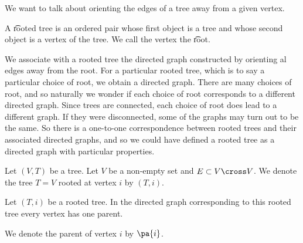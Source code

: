
\sbasic














\sstart
{}


We want to talk about orienting the edges of a tree away from a given vertex.


A \t{rooted tree} is an ordered pair whose first object is a tree and whose second object is a vertex of the tree. We call the vertex the \t{root}.

We associate with a rooted tree the directed graph constructed by orienting al edges away from the root.
For a particular rooted tree, which is to say a particular choice of root, we obtain a directed graph.
There are many choices of root, and so naturally we wonder if each choice of root corresponds to a different directed graph.
Since trees are connected, each choice of root does lead to a different graph.
If they were disconnected, some of the graphs may turn out to be the same.
So there is a one-to-one correspondence between rooted trees and their associated directed graphs, and so we could have defined a rooted tree as a directed graph with particular properties.


Let $(V, T)$ be a tree.
Let $V$ be a non-empty set and $E \subset V \cross V$.
We denote the tree $T = V$ rooted at vertex $i$ by $(T, i)$.


\begin{prop}
Let $(T, i)$ be a rooted tree.
In the directed graph corresponding to this rooted tree every vertex has one parent.
\end{prop}

We denote the parent of vertex $i$ by $\pa{i}$.
\strats
